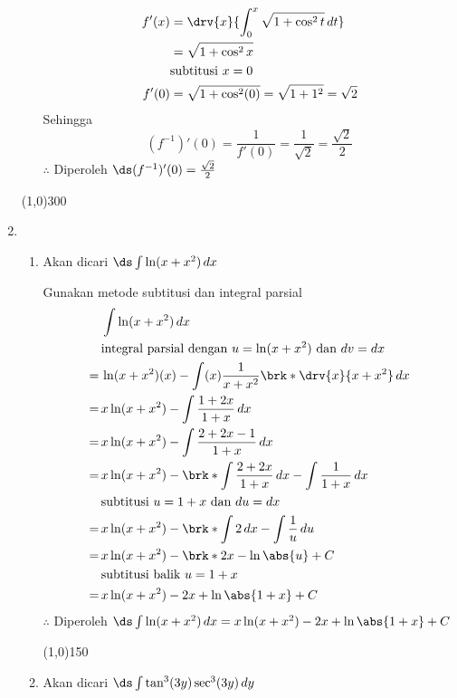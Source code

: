 \begin{enumerate}[leftmargin=*, label={\arabic*}.]
\begin{enumerate}[label={\alph*}.]
\begin{align*}
        f'(x)&=\drv{x}{\int_0^{x}\sqrt{1+\cos^{2}t}\,dt}\\
        &=\sqrt{1+\cos^{2}x}\\
        &\text{subtitusi $x=0$}\\
        f'(0) &= \sqrt{1+\cos^{2}(0)} = \sqrt{1+1^{2}} = \sqrt{2}
    \end{align*}
    Sehingga 
    \[
    (f^{-1})'(0) = \frac{1}{f'(0)} = \frac{1}{\sqrt{2}} = \frac{\sqrt{2}}{2}
    \]
    $\therefore$ Diperoleh $\ds (f^{-1})'(0)=\frac{\sqrt{2}}{2}$
\end{enumerate}
\begin{center}
    \line(1,0){300}
\end{center}
\item 
\begin{enumerate}[label={\alph*}.]
    \item Akan dicari $\ds\int \ln (x+x^{2})\,dx$
    
    Gunakan metode subtitusi dan integral parsial
    \begin{align*}
        &\int \ln (x+x^{2})\,dx\\
        &\text{integral parsial dengan $u=\ln(x+x^{2})$ dan $dv=dx$}\\
        =\,&\ln(x+x^{2})(x)-\int(x)\frac{1}{x+x^{2}}\brk*{\drv{x}{x+x^{2}}}\,dx\\
        =\,&x\ln(x+x^{2})-\int \frac{1+2x}{1+x}\,dx\\
        =\,&x\ln(x+x^{2})-\int \frac{2+2x-1}{1+x}\,dx\\
        =\,&x\ln(x+x^{2})-\brk*{\int \frac{2+2x}{1+x}\,dx-\int\frac{1}{1+x}\,dx}\\
        &\text{subtitusi $u=1+x$ dan $du=dx$}\\
        =\,&x\ln(x+x^{2})-\brk*{\int 2\,dx-\int\frac{1}{u}\,du}\\
        =\,&x\ln(x+x^{2})-\brk*{2x-\ln\abs{u}}+C\\
        &\text{subtitusi balik $u=1+x$}\\
        =\,&x\ln(x+x^{2})-2x+\ln\abs{1+x}+C\\
    \end{align*}
    $\therefore$ Diperoleh $\ds \int \ln (x+x^{2})\,dx
    =x\ln(x+x^{2})-2x+\ln\abs{1+x}+C$
\begin{center}
    \line(1,0){150}
\end{center}
    \item Akan dicari $\ds\int \tan^{3}(3y)\sec^{3}(3y)\,dy$
    

\end{enumerate}
\end{enumerate}

